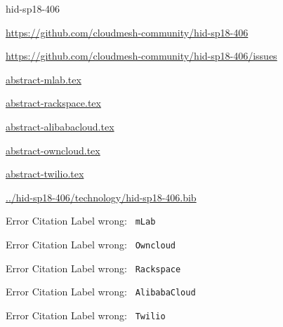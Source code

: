 \begin{IU}

hid-sp18-406

\url{https://github.com/cloudmesh-community/hid-sp18-406}

\url{https://github.com/cloudmesh-community/hid-sp18-406/issues}

\href{https://github.com/cloudmesh-community/hid-sp18-406/blob/master//technology/abstract-mlab.tex}{abstract-mlab.tex}

\href{https://github.com/cloudmesh-community/hid-sp18-406/blob/master//technology/abstract-rackspace.tex}{abstract-rackspace.tex}

\href{https://github.com/cloudmesh-community/hid-sp18-406/blob/master//technology/abstract-alibabacloud.tex}{abstract-alibabacloud.tex}

\href{https://github.com/cloudmesh-community/hid-sp18-406/blob/master//technology/abstract-owncloud.tex}{abstract-owncloud.tex}

\href{https://github.com/cloudmesh-community/hid-sp18-406/blob/master//technology/abstract-twilio.tex}{abstract-twilio.tex}

\href{https://github.com/cloudmesh-community/hid-sp18-406/blob/master//technology/hid-sp18-406.bib}{../hid-sp18-406/technology/hid-sp18-406.bib}

 Error Citation Label wrong: \verb| mLab |

 Error Citation Label wrong: \verb| Owncloud |

 Error Citation Label wrong: \verb| Rackspace |

 Error Citation Label wrong: \verb| AlibabaCloud |

 Error Citation Label wrong: \verb| Twilio |

\end{IU}


